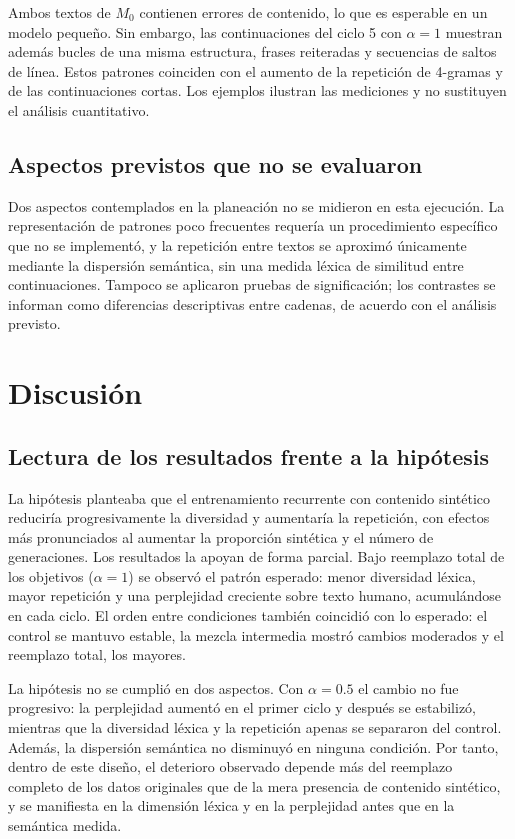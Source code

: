 \documentclass[12pt,letterpaper]{article}
\begin{document}
Ambos textos de \(M_0\) contienen errores de contenido, lo que es esperable
en un modelo pequeño. Sin embargo, las continuaciones del ciclo 5 con
\(\alpha=1\) muestran además bucles de una misma estructura, frases
reiteradas y secuencias de saltos de línea. Estos patrones coinciden con
el aumento de la repetición de 4-gramas y de las continuaciones cortas.
Los ejemplos ilustran las mediciones y no sustituyen el análisis
cuantitativo.

\subsection{Aspectos previstos que no se evaluaron}

Dos aspectos contemplados en la planeación no se midieron en esta
ejecución. La representación de patrones poco frecuentes requería un
procedimiento específico que no se implementó, y la repetición entre
textos se aproximó únicamente mediante la dispersión semántica, sin una
medida léxica de similitud entre continuaciones. Tampoco se aplicaron
pruebas de significación; los contrastes se informan como diferencias
descriptivas entre cadenas, de acuerdo con el análisis previsto.

\section{Discusión}

\subsection{Lectura de los resultados frente a la hipótesis}

La hipótesis planteaba que el entrenamiento recurrente con contenido
sintético reduciría progresivamente la diversidad y aumentaría la
repetición, con efectos más pronunciados al aumentar la proporción
sintética y el número de generaciones. Los resultados la apoyan de forma
parcial. Bajo reemplazo total de los objetivos (\(\alpha=1\)) se observó el
patrón esperado: menor diversidad léxica, mayor repetición y una
perplejidad creciente sobre texto humano, acumulándose en cada ciclo.
El orden entre condiciones también coincidió con lo esperado: el control
se mantuvo estable, la mezcla intermedia mostró cambios moderados y el
reemplazo total, los mayores.

La hipótesis no se cumplió en dos aspectos. Con \(\alpha=0.5\) el cambio no
fue progresivo: la perplejidad aumentó en el primer ciclo y después se
estabilizó, mientras que la diversidad léxica y la repetición apenas se
separaron del control. Además, la dispersión semántica no disminuyó en
ninguna condición. Por tanto, dentro de este diseño, el deterioro observado
depende más del reemplazo completo de los datos originales que de la mera
presencia de contenido sintético, y se manifiesta en la dimensión léxica
y en la perplejidad antes que en la semántica medida.
\end{document}
